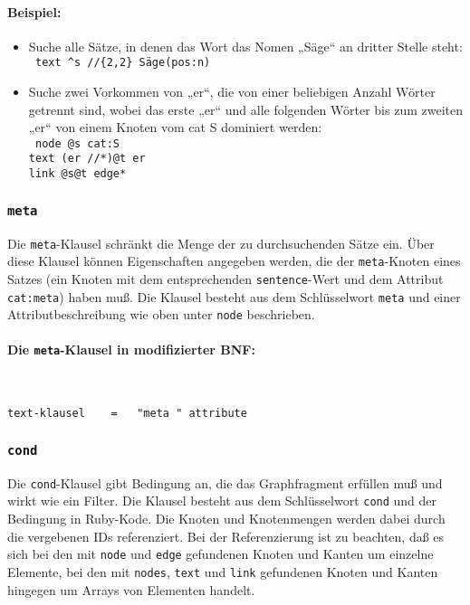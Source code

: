 \documentclass[12pt]{scrartcl}
\begin{document}
\paragraph*{Beispiel:}
\begin{itemize}
	\item Suche alle Sätze, in denen das Wort das Nomen „Säge“ an dritter Stelle steht:\\
	{\tt
	text \^{}s //\{2,2\} Säge(pos:n)
	}
	\item Suche zwei Vorkommen von „er“, die von einer beliebigen Anzahl Wörter getrennt sind, wobei das erste „er“ und alle folgenden Wörter bis zum zweiten „er“ von einem Knoten vom cat S dominiert werden:\\
	{\tt
	node @s cat:S\\
	text (er //*)@t er\\
	link @s@t edge*
	}
\end{itemize}



\subsubsection{\texttt{meta}}

Die \texttt{meta}-Klausel schränkt die Menge der zu durchsuchenden Sätze ein. Über diese Klausel können Eigenschaften angegeben werden, die der \texttt{meta}-Knoten eines Satzes (ein Knoten mit dem entsprechenden \texttt{sentence}-Wert und dem Attribut \texttt{cat:meta}) haben muß. Die Klausel besteht aus dem Schlüsselwort \texttt{meta} und einer Attributbeschreibung wie oben unter \texttt{node} beschrieben.

\paragraph*{Die \texttt{meta}-Klausel in modifizierter BNF:}
~
\begin{framed}
\begin{lstlisting}
text-klausel    =   "meta " attribute
\end{lstlisting}
\end{framed}



\subsubsection{\texttt{cond}}\label{cond}

Die \texttt{cond}-Klausel gibt Bedingung an, die das Graphfragment erfüllen muß und wirkt wie ein Filter. Die Klausel besteht aus dem Schlüsselwort \texttt{cond} und der Bedingung in Ruby-Kode. Die Knoten und Knotenmengen werden dabei durch die vergebenen IDs referenziert. Bei der Referenzierung ist zu beachten, daß es sich bei den mit \texttt{node} und \texttt{edge} gefundenen Knoten und Kanten um einzelne Elemente, bei den mit \texttt{nodes}, \texttt{text} und \texttt{link} gefundenen Knoten und Kanten hingegen um Arrays von Elementen handelt.
\end{document}

